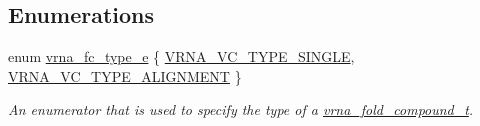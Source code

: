 \subsection*{Enumerations}
\begin{DoxyCompactItemize}
\item 
enum \hyperlink{group__fold__compound_ga01a4ff86fa71deaaa5d1abbd95a1447d}{vrna\-\_\-fc\-\_\-type\-\_\-e} \{ \hyperlink{group__fold__compound_gga01a4ff86fa71deaaa5d1abbd95a1447da1608d3aa78905fc39e0d25a624ac9512}{V\-R\-N\-A\-\_\-\-V\-C\-\_\-\-T\-Y\-P\-E\-\_\-\-S\-I\-N\-G\-L\-E}, 
\hyperlink{group__fold__compound_gga01a4ff86fa71deaaa5d1abbd95a1447da056345f1bcfe7cd595d1fd437c05246d}{V\-R\-N\-A\-\_\-\-V\-C\-\_\-\-T\-Y\-P\-E\-\_\-\-A\-L\-I\-G\-N\-M\-E\-N\-T}
 \}
\begin{DoxyCompactList}\small\item\em An enumerator that is used to specify the type of a \hyperlink{group__fold__compound_ga1b0cef17fd40466cef5968eaeeff6166}{vrna\-\_\-fold\-\_\-compound\-\_\-t}. \end{DoxyCompactList}\end{DoxyCompactItemize}
